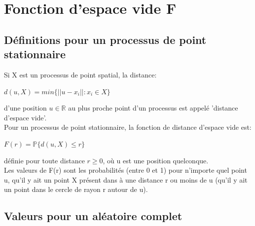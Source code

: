 \documentclass[french,12pt,a4paper]{report}
\begin{document}

\section{Fonction d'espace vide F}

\subsection{Définitions pour un processus de point stationnaire}
Si X est un processus de point spatial, la distance:
\begin{center}\begin{math} d(u,X) = min\{ ||u-x_i|| : x_i \in X \} \end{math}\end{center}
d'une position \begin{math} u \in \mathbb{R} \end{math} au plus proche point d'un processus est appelé 'distance d'espace vide'.\\
Pour un processus de point stationnaire, la fonction de distance d'espace vide est:
\begin{center}\begin{math} F(r) = \mathbb{P}\{ d(u,X) \leq r \} \end{math}\end{center}
définie pour toute distance \begin{math} r \geq 0 \end{math}, où u est une position quelconque.\\

Les valeurs de F(r) sont les probabilités (entre 0 et 1) pour n'importe quel point u, qu'il y ait un point X présent dans à une distance r ou moins de u (qu'il y ait un point dans le cercle de rayon r autour de u).\\


\subsection{Valeurs pour un aléatoire complet}
\end{document}
